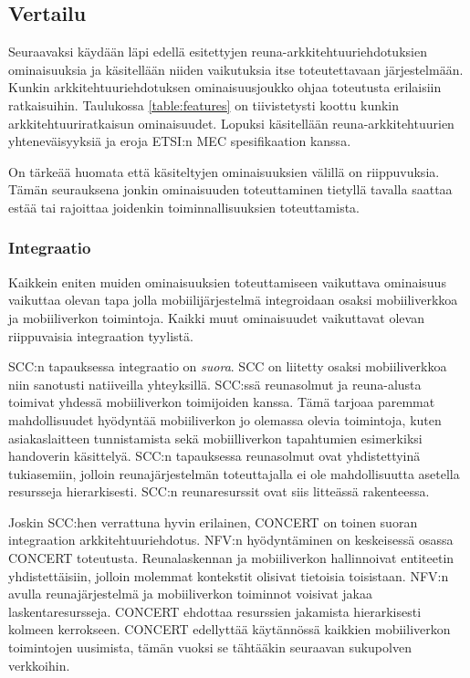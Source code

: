 \subsection{Vertailu}
Seuraavaksi käydään läpi edellä esitettyjen reuna-arkkitehtuuriehdotuksien ominaisuuksia ja käsitellään niiden vaikutuksia itse toteutettavaan järjestelmään.
Kunkin arkkitehtuuriehdotuksen ominaisuusjoukko ohjaa toteutusta erilaisiin ratkaisuihin. Taulukossa \ref{table:features} on tiivistetysti koottu kunkin arkkitehtuuriratkaisun ominaisuudet.
Lopuksi käsitellään reuna-arkkitehtuurien yhteneväisyyksiä ja eroja ETSI:n MEC spesifikaation kanssa.

On tärkeää huomata että käsiteltyjen ominaisuuksien välillä on riippuvuksia. Tämän seurauksena jonkin ominaisuuden toteuttaminen tietyllä tavalla saattaa estää tai rajoittaa joidenkin toiminnallisuuksien toteuttamista. 

\subsubsection{Integraatio}

Kaikkein eniten muiden ominaisuuksien toteuttamiseen vaikuttava ominaisuus vaikuttaa olevan tapa jolla mobiilijärjestelmä integroidaan osaksi mobiiliverkkoa ja mobiiliverkon toimintoja.
Kaikki muut ominaisuudet vaikuttavat olevan riippuvaisia integraation tyylistä. 

SCC:n tapauksessa integraatio on \textit{suora}. SCC on liitetty osaksi mobiiliverkkoa niin sanotusti natiiveilla yhteyksillä. SCC:ssä reunasolmut ja reuna-alusta toimivat yhdessä mobiiliverkon toimijoiden kanssa.
Tämä tarjoaa paremmat mahdollisuudet hyödyntää mobiiliverkon jo olemassa olevia toimintoja, kuten asiakaslaitteen tunnistamista sekä mobiilliverkon tapahtumien esimerkiksi handoverin käsittelyä. 
SCC:n tapauksessa reunasolmut ovat yhdistettyinä tukiasemiin, jolloin reunajärjestelmän toteuttajalla ei ole mahdollisuutta asetella resursseja hierarkisesti. SCC:n reunaresurssit ovat siis litteässä rakenteessa.

Joskin SCC:hen verrattuna hyvin erilainen, CONCERT on toinen suoran integraation arkkitehtuuriehdotus.
NFV:n hyödyntäminen on keskeisessä osassa CONCERT toteutusta.
Reunalaskennan ja mobiiliverkon hallinnoivat entiteetin yhdistettäisiin, jolloin molemmat kontekstit olisivat tietoisia toisistaan.
NFV:n avulla reunajärjestelmä ja mobiiliverkon toiminnot voisivat jakaa laskentaresursseja. CONCERT ehdottaa resurssien jakamista hierarkisesti kolmeen kerrokseen.
CONCERT edellyttää käytännössä kaikkien mobiiliverkon toimintojen uusimista, tämän vuoksi se tähtääkin seuraavan sukupolven verkkoihin. 

